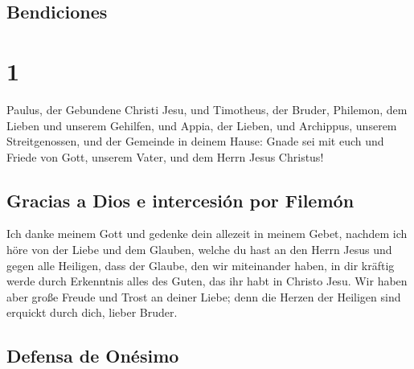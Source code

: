 \hypertarget{bendiciones}{%
\subsection{Bendiciones}\label{bendiciones}}

\hypertarget{section}{%
\section{1}\label{section}}

 Paulus, der Gebundene Christi Jesu, und Timotheus, der
Bruder, Philemon, dem Lieben und unserem Gehilfen,  und
Appia, der Lieben, und Archippus, unserem Streitgenossen, und der
Gemeinde in deinem Hause:  Gnade sei mit euch und Friede
von Gott, unserem Vater, und dem Herrn Jesus Christus!

\hypertarget{gracias-a-dios-e-intercesiuxf3n-por-filemuxf3n}{%
\subsection{Gracias a Dios e intercesión por
Filemón}\label{gracias-a-dios-e-intercesiuxf3n-por-filemuxf3n}}

 Ich danke meinem Gott und gedenke dein allezeit in meinem
Gebet,  nachdem ich höre von der Liebe und dem Glauben,
welche du hast an den Herrn Jesus und gegen alle Heiligen,
 dass der Glaube, den wir miteinander haben, in dir
kräftig werde durch Erkenntnis alles des Guten, das ihr habt in Christo
Jesu.  Wir haben aber große Freude und Trost an deiner
Liebe; denn die Herzen der Heiligen sind erquickt durch dich, lieber
Bruder.

\hypertarget{defensa-de-onuxe9simo}{%
\subsection{Defensa de Onésimo}\label{defensa-de-onuxe9simo}}

